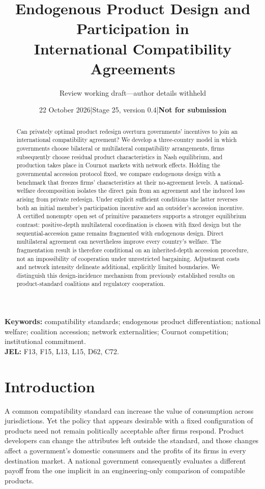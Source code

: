 \documentclass[11pt,a4paper]{article}
\title{Endogenous Product Design and Participation in\\ International Compatibility Agreements}
\author{Review working draft---author details withheld}
\date{22 October 2026\quad |\quad Stage 25, version 0.4\quad |\quad \textbf{Not for submission}}
\theoremstyle{remark}\newtheorem{remark}[theorem]{Remark}
\begin{document}
\maketitle
\begin{abstract}
Can privately optimal product redesign overturn governments' incentives to join an international compatibility agreement? We develop a three-country model in which governments choose bilateral or multilateral compatibility arrangements, firms subsequently choose residual product characteristics in Nash equilibrium, and production takes place in Cournot markets with network effects. Holding the governmental accession protocol fixed, we compare endogenous design with a benchmark that freezes firms' characteristics at their no-agreement levels. A national-welfare decomposition isolates the direct gain from an agreement and the induced loss arising from private redesign. Under explicit sufficient conditions the latter reverses both an initial member's participation incentive and an outsider's accession incentive. A certified nonempty open set of primitive parameters supports a stronger equilibrium contrast: positive-depth multilateral coordination is chosen with fixed design but the sequential-accession game remains fragmented with endogenous design. Direct multilateral agreement can nevertheless improve every country's welfare. The fragmentation result is therefore conditional on an inherited-depth accession procedure, not an impossibility of cooperation under unrestricted bargaining. Adjustment costs and network intensity delineate additional, explicitly limited boundaries. We distinguish this design-incidence mechanism from previously established results on product-standard coalitions and regulatory cooperation.
\end{abstract}
\noindent\textbf{Keywords:} compatibility standards; endogenous product differentiation; national welfare; coalition accession; network externalities; Cournot competition; institutional commitment.\\
\textbf{JEL:} F13, F15, L13, L15, D62, C72.

\section{Introduction}
A common compatibility standard can increase the value of consumption across jurisdictions. Yet the policy that appears desirable with a fixed configuration of products need not remain politically acceptable after firms respond. Product developers can change the attributes left outside the standard, and those changes affect a government's domestic consumers and the profits of its firms in every destination market. A national government consequently evaluates a different payoff from the one implicit in an engineering-only comparison of compatible products.
\end{document}
